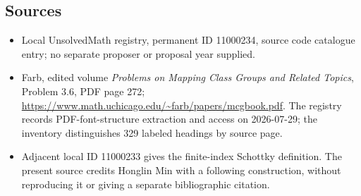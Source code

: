 \documentclass[11pt]{article}
\begin{document}
\subsection{Sources}
\begin{itemize}
\item Local UnsolvedMath registry, permanent ID 11000234, source code catalogue entry; no separate proposer or proposal year supplied.
\item Farb, edited volume \emph{Problems on Mapping Class Groups and Related Topics}, Problem 3.6, PDF page 272; \url{https://www.math.uchicago.edu/~farb/papers/mcgbook.pdf}. The registry records PDF-font-structure extraction and access on 2026-07-29; the inventory distinguishes 329 labeled headings by source page.
\item Adjacent local ID 11000233 gives the finite-index Schottky definition. The present source credits Honglin Min with a following construction, without reproducing it or giving a separate bibliographic citation.
\end{itemize}
\end{document}
